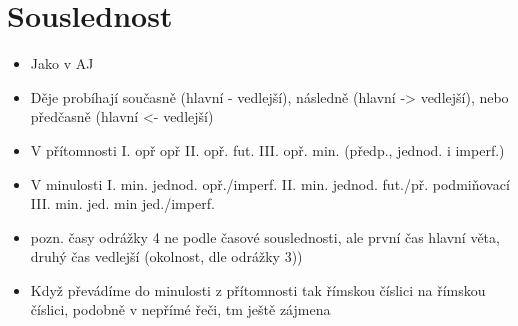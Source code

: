 \documentclass{article}
\begin{document}
\section{Souslednost}
\begin{itemize}
  \item Jako v AJ
  \item Děje probíhají současně (hlavní - vedlejší), následně (hlavní -> vedlejší), nebo předčasně (hlavní <- vedlejší)
  \item V přítomnosti I. opř opř II. opř. fut. III. opř. min. (předp., jednod. i imperf.)
  \item V minulosti I. min. jednod. opř./imperf. II. min. jednod. fut./př. podmiňovací III. min. jed. min jed./imperf.
  \item pozn. časy odrážky 4 ne podle časové souslednosti, ale první čas hlavní věta, druhý čas vedlejší (okolnost, dle odrážky 3))
  \item Když převádíme do minulosti z přítomnosti tak římskou číslici na římskou číslici, podobně v nepřímé řeči, tm ještě zájmena
\end{itemize}
\end{document}
